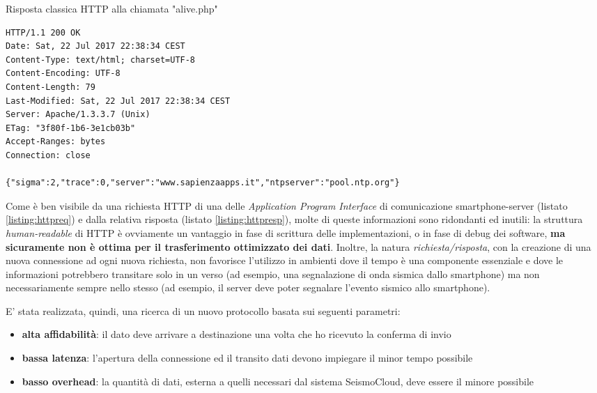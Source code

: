 \documentclass[a4paper,10pt]{memoir}
\begin{document}
\begin{listing}[h]
\caption{Risposta classica HTTP alla chiamata "alive.php"}
\label{listing:httpresp}
\begin{verbatim}
HTTP/1.1 200 OK
Date: Sat, 22 Jul 2017 22:38:34 CEST
Content-Type: text/html; charset=UTF-8
Content-Encoding: UTF-8
Content-Length: 79
Last-Modified: Sat, 22 Jul 2017 22:38:34 CEST
Server: Apache/1.3.3.7 (Unix)
ETag: "3f80f-1b6-3e1cb03b"
Accept-Ranges: bytes
Connection: close

{"sigma":2,"trace":0,"server":"www.sapienzaapps.it","ntpserver":"pool.ntp.org"}
\end{verbatim}
\end{listing}

Come è ben visibile da una richiesta HTTP di una delle \textit{Application Program Interface} di comunicazione smartphone-server (listato \ref{listing:httpreq}) e dalla relativa risposta (listato \ref{listing:httpresp}), molte di queste informazioni sono ridondanti ed inutili: la struttura \textit{human-readable} di HTTP è ovviamente un vantaggio in fase di scrittura delle implementazioni, o in fase di debug dei software, \textbf{ma sicuramente non è ottima per il trasferimento ottimizzato dei dati}. Inoltre, la natura \textit{richiesta/risposta}, con la creazione di una nuova connessione ad ogni nuova richiesta, non favorisce l'utilizzo in ambienti dove il tempo è una componente essenziale e dove le informazioni potrebbero transitare solo in un verso (ad esempio, una segnalazione di onda sismica dallo smartphone) ma non necessariamente sempre nello stesso (ad esempio, il server deve poter segnalare l'evento sismico allo smartphone).

\pagebreak 

E' stata realizzata, quindi, una ricerca di un nuovo protocollo basata sui seguenti parametri:
\begin{itemize}
\item \textbf{alta affidabilità}: il dato deve arrivare a destinazione una volta che ho ricevuto la conferma di invio
\item \textbf{bassa latenza}: l'apertura della connessione ed il transito dati devono impiegare il minor tempo possibile
\item \textbf{basso overhead}: la quantità di dati, esterna a quelli necessari dal sistema SeismoCloud, deve essere il minore possibile
\end{itemize}
\end{document}
